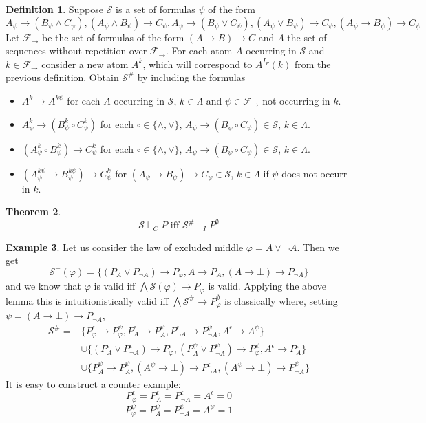 \documentclass[a4paper,12pt]{report}
\theoremstyle{definition}
\newtheorem{theorem}{Theorem}[section]
\theoremstyle{definition}
\theoremstyle{definition}
\theoremstyle{definition}
\theoremstyle{definition}
\newtheorem{definition}[theorem]{Definition}
\theoremstyle{definition}
\newtheorem{example}[theorem]{Example}
\theoremstyle{definition}
\begin{document}
	\begin{definition}
		Suppose $\mathcal S$ is a set of formulas $\psi$ of the form
		$$A_\psi\to (B_\psi\wedge C_\psi), (A_\psi\wedge B_\psi)\to C_\psi, A_\psi\to (B_\psi\vee C_\psi),(A_\psi\vee B_\psi)\to C_\psi, (A_\psi\to B_\psi)\to C_\psi$$
		Let $\mathcal F_\to$ be the set of formulas of the form $(A\to B)\to C$ and $\Lambda$ the set of sequences without repetition over $\mathcal F_\to$. For each atom $A$ occurring in $\mathcal S$ and $k\in \mathcal F_\to$ consider a new atom $A^{k}$, which will correspond to $A^{I_F}(k)$ from the previous definition. Obtain $\mathcal S^\#$ by including the formulas
		\begin{itemize}
			\item $A^k\to A^{k\psi}$ for each $A$ occurring in $\mathcal S$, $k\in\Lambda$ and $\psi\in\mathcal F_\to$ not occurring in $k$.
			\item $A^k_\psi\to (B^k_\psi\circ C^k_\psi)$ for each $\circ\in\{\wedge,\vee\}$, $A_\psi\to (B_\psi\circ C_\psi)\in\mathcal S$, $k\in\Lambda$.
			\item $(A^k_\psi\circ B^k_\psi)\to C^k_\psi$ for each $\circ\in\{\wedge,\vee\}$, $A_\psi\to (B_\psi\circ C_\psi)\in\mathcal S$, $k\in\Lambda$.
			\item $(A^{k\psi}_\psi\to B^{k\psi}_\psi)\to C^k_\psi$ for $(A_\psi\to B_\psi)\to C_\psi\in\mathcal S$, $k\in\Lambda$ if $\psi$ does not occurr in $k$.
		\end{itemize}
	\end{definition}
	
	\begin{theorem}
		$$\mathcal S\models_C P\text{ iff }\mathcal S^\#\models_I P^\emptyset$$
	\end{theorem}
	
	\begin{example}
		Let us consider the law of excluded middle $\varphi = A\vee\neg A$. Then we get
		$$\mathcal S^-(\varphi) = \{(P_A\vee P_{\neg A})\to P_\varphi, A\to P_A, (A\to \bot)\to P_{\neg A}\}$$
		and we know that $\varphi$ is valid iff $\bigwedge \mathcal S(\varphi)\to P_\varphi$ is valid. Applying the above lemma this is intuitionistically valid iff $\bigwedge\mathcal S^\#\to P^\emptyset_\varphi$ is classically where, setting $\psi = (A\to \bot)\to P_{\neg A}$,
		\begin{align*}
			\mathcal S^\# =&\{P_\varphi^\epsilon\to P_\varphi^{\psi}, P_A^\epsilon\to P_A^{\psi},P_{\neg A}^\epsilon\to P_{\neg A}^{\psi},A^\epsilon\to A^{\psi}\}\\ &\cup\{(P_A^\epsilon\vee P_{\neg A}^\epsilon)\to P_\varphi^\epsilon, (P_A^{\psi}\vee P_{\neg A}^{\psi})\to P_\varphi^{\psi},  A^\epsilon\to P_A^\epsilon\}\\ &\cup \{P_A^{\psi}\to P_A^{\psi}, (A^{\psi}\to \bot)\to P_{\neg A}^\epsilon, (A^{\psi}\to \bot)\to P_{\neg A}^{\psi}\}
		\end{align*}
		It is easy to construct a counter example:
		$$P_\varphi^\epsilon  = P_A^\epsilon = P_{\neg A}^\epsilon = A^\epsilon = 0$$
		$$P_{\varphi}^{\psi} = P_A^{\psi} =  P_{\neg A}^{\psi} = A^{\psi} = 1$$
	\end{example}	
	
\end{document}
